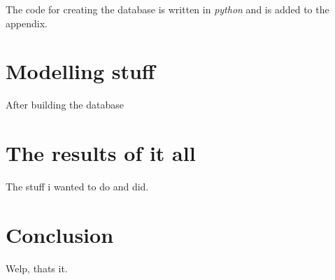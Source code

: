 \documentclass[12pt,oneside]{reedthesis}
\theoremstyle{definition}
\theoremstyle{definition}
\theoremstyle{definition}
\theoremstyle{remark}
\begin{document}
The code for creating the database is written in \emph{python} and is
added to the appendix.

\chapter{Modelling stuff}\label{modelling-stuff}

After building the database

\chapter{The results of it all}\label{the-results-of-it-all}

The stuff i wanted to do and did.

\chapter*{Conclusion}\label{conclusion}

Welp, thats it.

\appendix
\end{document}
